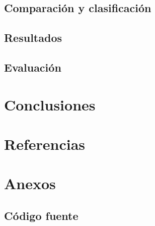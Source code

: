 \documentclass[letter]{article}
\begin{document}
\subsection{Comparación y clasificación}
\label{sec:org599fa48}

\subsection{Resultados}
\label{sec:orgb16deeb}
\subsection{Evaluación}
\label{sec:orgbeb77e2}
\section{Conclusiones}
\label{sec:org903f7b7}

\section{Referencias}
\label{sec:orgd41bd33}

\section{Anexos}
\label{sec:org527158a}
\subsection{Código fuente}
\label{sec:org4489e71}
\end{document}
